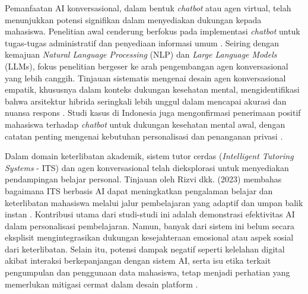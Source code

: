 Pemanfaatan AI konversasional, dalam bentuk \textit{chatbot} atau agen virtual, telah menunjukkan potensi signifikan dalam menyediakan dukungan kepada mahasiswa. Penelitian awal cenderung berfokus pada implementasi \textit{chatbot} untuk tugas-tugas administratif dan penyediaan informasi umum \cite{ai_chatbots_education_advances_2024}. Seiring dengan kemajuan \textit{Natural Language Processing} (NLP) dan \textit{Large Language Models} (LLMs), fokus penelitian bergeser ke arah pengembangan agen konversasional yang lebih canggih. Tinjauan sistematis mengenai desain agen konversasional empatik, khususnya dalam konteks dukungan kesehatan mental, mengidentifikasi bahwa arsitektur hibrida seringkali lebih unggul dalam mencapai akurasi dan nuansa respons \cite{empathetic_conversational_agents_mental_health_2024}. Studi kasus di Indonesia juga mengonfirmasi penerimaan positif mahasiswa terhadap \textit{chatbot} untuk dukungan kesehatan mental awal, dengan catatan penting mengenai kebutuhan personalisasi dan penanganan privasi \cite{chatbot_student_mental_health_unuja}.

Dalam domain keterlibatan akademik, sistem tutor cerdas (\textit{Intelligent Tutoring Systems} - ITS) dan agen konversasional telah dieksplorasi untuk menyediakan pendampingan belajar personal. Tinjauan oleh Rizvi dkk. (2023) membahas bagaimana ITS berbasis AI dapat meningkatkan pengalaman belajar dan keterlibatan mahasiswa melalui jalur pembelajaran yang adaptif dan umpan balik instan \cite{rizvi_ai_tutoring_review_2023}. Kontribusi utama dari studi-studi ini adalah demonstrasi efektivitas AI dalam personalisasi pembelajaran. Namun, banyak dari sistem ini belum secara eksplisit mengintegrasikan dukungan kesejahteraan emosional atau aspek sosial dari keterlibatan. Selain itu, potensi dampak negatif seperti kelelahan digital akibat interaksi berkepanjangan dengan sistem AI, serta isu etika terkait pengumpulan dan penggunaan data mahasiswa, tetap menjadi perhatian yang memerlukan mitigasi cermat dalam desain platform \cite{ai_effects_student_wellbeing_2025}.


